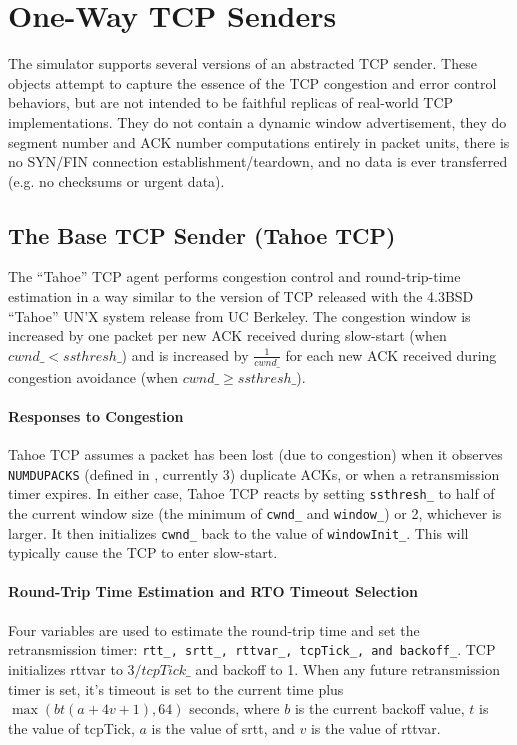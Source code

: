 \section{One-Way TCP Senders}
\label{sec:oneWayTcp}

The simulator supports several versions of an abstracted TCP sender.
These objects attempt to capture the essence of the TCP congestion
and error control behaviors, but are not intended to be faithful
replicas of real-world TCP implementations.
They do not contain a dynamic window advertisement, they do segment
number and ACK number computations entirely in packet units,
there is no SYN/FIN connection establishment/teardown, and no
data is ever transferred (e.g. no checksums or urgent data).

\subsection{The Base TCP Sender (Tahoe TCP)}
\label{sec:tahoetcp}

The ``Tahoe'' TCP agent  performs congestion
control and round-trip-time estimation
in a way similar to the version of TCP released with the
4.3BSD ``Tahoe'' UN'X system release from UC Berkeley.
The congestion window is increased by one packet per new ACK received
during slow-start (when $cwnd\_ < ssthresh\_$) and is increased
by $\frac{1}{cwnd\_}$ for each new ACK received during congestion avoidance
(when $cwnd\_ \geq ssthresh\_$).

\paragraph{Responses to Congestion}
Tahoe TCP assumes a packet has been lost (due to congestion)
when it observes {\tt NUMDUPACKS} (defined in , currently 3)
duplicate ACKs, or when a retransmission timer expires.
In either case, Tahoe TCP reacts by setting {\tt ssthresh\_} to half
of the current window size (the minimum of {\tt cwnd\_} and {\tt window\_})
or 2, whichever is larger.
It then initializes {\tt cwnd\_} back to the value of
{\tt windowInit\_}.  This will typically cause the TCP to
enter slow-start.

\paragraph{Round-Trip Time Estimation and RTO Timeout Selection}
Four variables are used to estimate the round-trip time and
set the retransmission timer: {\tt rtt\_, srtt\_, rttvar\_, tcpTick\_,
and backoff\_}.
TCP initializes rttvar to $3/tcpTick\_$ and backoff to 1.
When any future retransmission timer is set, it's timeout
is set to the current time plus $\max(bt(a+4v+1), 64)$ seconds,
where $b$ is the current backoff value, $t$ is the value of tcpTick,
$a$ is the value of srtt, and $v$ is the value of rttvar.


